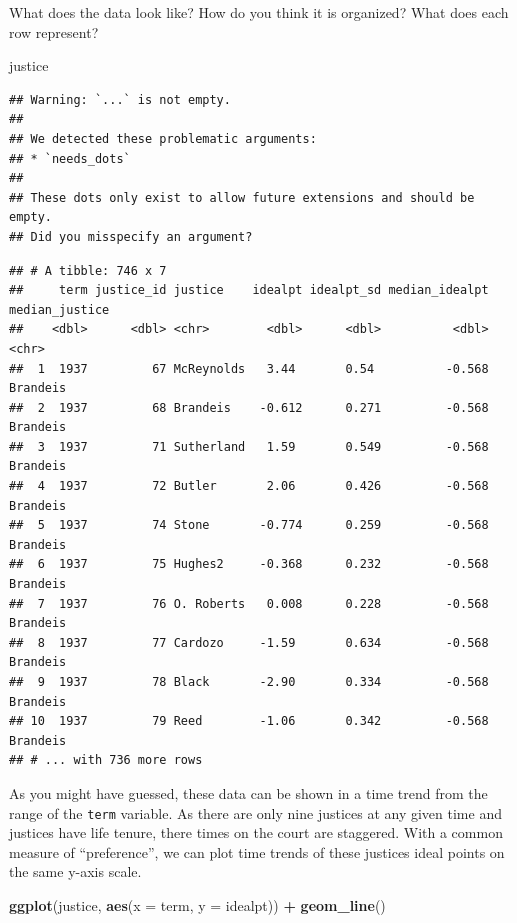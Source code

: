 \documentclass[
]{book}
\newenvironment{Shaded}{\begin{snugshade}}{\end{snugshade}}
\newcommand{\DataTypeTok}[1]{\textcolor[rgb]{0.13,0.29,0.53}{#1}}
\newcommand{\KeywordTok}[1]{\textcolor[rgb]{0.13,0.29,0.53}{\textbf{#1}}}
\newcommand{\NormalTok}[1]{#1}
\newcommand{\OperatorTok}[1]{\textcolor[rgb]{0.81,0.36,0.00}{\textbf{#1}}}
\newcommand{\StringTok}[1]{\textcolor[rgb]{0.31,0.60,0.02}{#1}}
\theoremstyle{definition}
\theoremstyle{definition}
\theoremstyle{definition}
\theoremstyle{definition}
\theoremstyle{remark}
\begin{document}
What does the data look like? How do you think it is organized? What does each row represent?

\begin{Shaded}
\begin{Highlighting}[]
\NormalTok{justice}
\end{Highlighting}
\end{Shaded}

\begin{verbatim}
## Warning: `...` is not empty.
## 
## We detected these problematic arguments:
## * `needs_dots`
## 
## These dots only exist to allow future extensions and should be empty.
## Did you misspecify an argument?
\end{verbatim}

\begin{verbatim}
## # A tibble: 746 x 7
##     term justice_id justice    idealpt idealpt_sd median_idealpt median_justice
##    <dbl>      <dbl> <chr>        <dbl>      <dbl>          <dbl> <chr>         
##  1  1937         67 McReynolds   3.44       0.54          -0.568 Brandeis      
##  2  1937         68 Brandeis    -0.612      0.271         -0.568 Brandeis      
##  3  1937         71 Sutherland   1.59       0.549         -0.568 Brandeis      
##  4  1937         72 Butler       2.06       0.426         -0.568 Brandeis      
##  5  1937         74 Stone       -0.774      0.259         -0.568 Brandeis      
##  6  1937         75 Hughes2     -0.368      0.232         -0.568 Brandeis      
##  7  1937         76 O. Roberts   0.008      0.228         -0.568 Brandeis      
##  8  1937         77 Cardozo     -1.59       0.634         -0.568 Brandeis      
##  9  1937         78 Black       -2.90       0.334         -0.568 Brandeis      
## 10  1937         79 Reed        -1.06       0.342         -0.568 Brandeis      
## # ... with 736 more rows
\end{verbatim}

As you might have guessed, these data can be shown in a time trend from the range of the \texttt{term} variable. As there are only nine justices at any given time and justices have life tenure, there times on the court are staggered. With a common measure of ``preference'', we can plot time trends of these justices ideal points on the same y-axis scale.

\begin{Shaded}
\begin{Highlighting}[]
\KeywordTok{ggplot}\NormalTok{(justice, }\KeywordTok{aes}\NormalTok{(}\DataTypeTok{x =}\NormalTok{ term, }\DataTypeTok{y =}\NormalTok{ idealpt)) }\OperatorTok{+}
\StringTok{  }\KeywordTok{geom_line}\NormalTok{()}
\end{Highlighting}
\end{Shaded}
\end{document}
